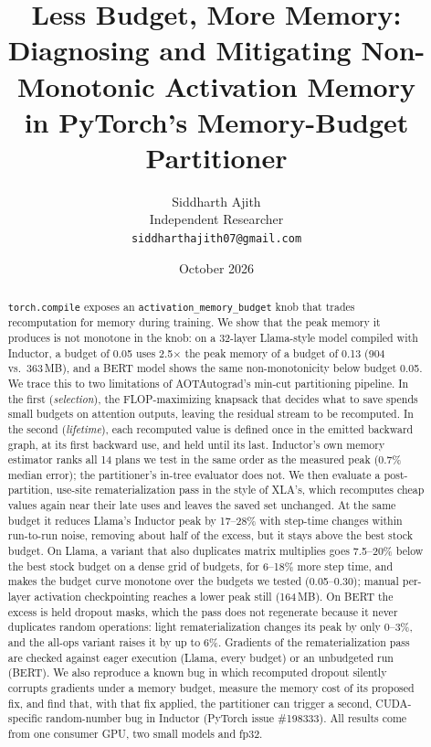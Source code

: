 \documentclass[10pt]{article}
\title{Less Budget, More Memory:\\ Diagnosing and Mitigating Non-Monotonic Activation Memory\\
in PyTorch's Memory-Budget Partitioner}
\author{Siddharth Ajith\\
Independent Researcher\\
\texttt{siddharthajith07@gmail.com}}
\date{October 2026}
\newcommand{\code}[1]{\texttt{#1}}
\begin{document}
\maketitle

\begin{abstract}
\code{torch.compile} exposes an \code{activation\_memory\_budget} knob that trades recomputation for memory during training.
We show that the peak memory it produces is not monotone in the knob: on a 32-layer Llama-style model compiled with
Inductor, a budget of 0.05 uses 2.5$\times$ the peak memory of a budget of 0.13 (904 vs.\ 363\,MB), and a BERT model
shows the same non-monotonicity below budget 0.05.
We trace this to two limitations of AOTAutograd's min-cut partitioning pipeline. In the first (\emph{selection}), the
FLOP-maximizing knapsack that decides what to save spends small budgets on attention outputs, leaving the residual stream to
be recomputed. In the second (\emph{lifetime}), each recomputed value is defined once in the emitted backward graph, at its first backward use, and
held until its last.
Inductor's own memory estimator ranks all 14 plans we test in the same order as the measured peak (0.7\% median error);
the partitioner's in-tree evaluator does not.
We then evaluate a post-partition, use-site rematerialization pass in the style of XLA's, which recomputes cheap values
again near their late uses and leaves the saved set unchanged. At the same budget it reduces Llama's Inductor peak by
17--28\% with step-time changes within run-to-run noise, removing about half of the excess, but it stays above the best
stock budget. On Llama, a variant that also duplicates matrix multiplies goes 7.5--20\% below the best stock budget on a
dense grid of budgets, for 6--18\% more step time, and makes the budget curve monotone over the budgets we tested
(0.05--0.30); manual per-layer activation checkpointing reaches a lower peak still (164\,MB). On BERT the excess is held dropout masks, which the pass does not regenerate because it never duplicates
random operations: light rematerialization changes its peak by only 0--3\%, and the all-ops variant raises it by up to 6\%. Gradients of the rematerialization pass are checked against eager execution (Llama, every budget) or an unbudgeted run (BERT).
We also reproduce a known bug in which recomputed dropout silently corrupts gradients under a memory budget, measure
the memory cost of its proposed fix, and find that, with that fix applied, the partitioner can trigger a second,
CUDA-specific random-number bug in Inductor (PyTorch issue \#198333). All results come from one consumer GPU, two small models and fp32.
\end{abstract}
\end{document}
